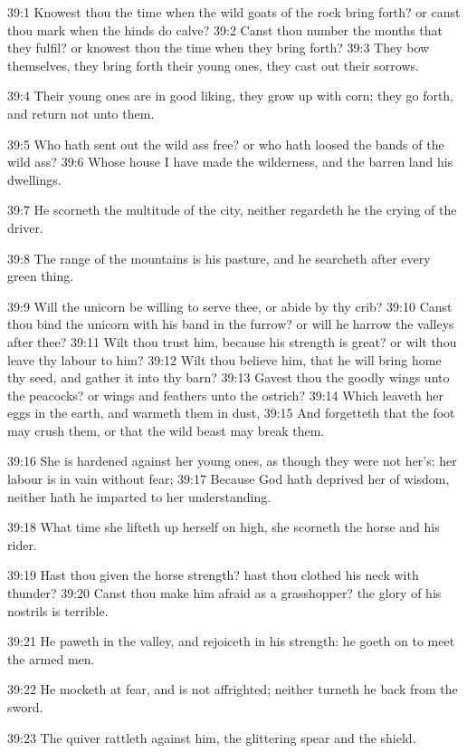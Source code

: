 39:1 Knowest thou the time when the wild goats of the rock bring forth? or canst thou mark when the hinds do calve?  39:2 Canst thou number the months that they fulfil? or knowest thou the time when they bring forth?  39:3 They bow themselves, they bring forth their young ones, they cast out their sorrows.

39:4 Their young ones are in good liking, they grow up with corn; they go forth, and return not unto them.

39:5 Who hath sent out the wild ass free? or who hath loosed the bands of the wild ass?  39:6 Whose house I have made the wilderness, and the barren land his dwellings.

39:7 He scorneth the multitude of the city, neither regardeth he the crying of the driver.

39:8 The range of the mountains is his pasture, and he searcheth after every green thing.

39:9 Will the unicorn be willing to serve thee, or abide by thy crib?  39:10 Canst thou bind the unicorn with his band in the furrow? or will he harrow the valleys after thee?  39:11 Wilt thou trust him, because his strength is great? or wilt thou leave thy labour to him?  39:12 Wilt thou believe him, that he will bring home thy seed, and gather it into thy barn?  39:13 Gavest thou the goodly wings unto the peacocks?  or wings and feathers unto the ostrich?  39:14 Which leaveth her eggs in the earth, and warmeth them in dust, 39:15 And forgetteth that the foot may crush them, or that the wild beast may break them.

39:16 She is hardened against her young ones, as though they were not her's: her labour is in vain without fear; 39:17 Because God hath deprived her of wisdom, neither hath he imparted to her understanding.

39:18 What time she lifteth up herself on high, she scorneth the horse and his rider.

39:19 Hast thou given the horse strength? hast thou clothed his neck with thunder?  39:20 Canst thou make him afraid as a grasshopper? the glory of his nostrils is terrible.

39:21 He paweth in the valley, and rejoiceth in his strength: he goeth on to meet the armed men.

39:22 He mocketh at fear, and is not affrighted; neither turneth he back from the sword.

39:23 The quiver rattleth against him, the glittering spear and the shield.

